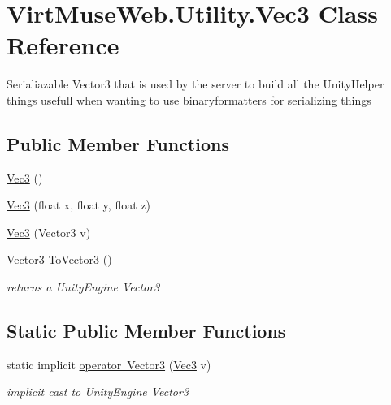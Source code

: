 \hypertarget{class_virt_muse_web_1_1_utility_1_1_vec3}{}\section{Virt\+Muse\+Web.\+Utility.\+Vec3 Class Reference}
\label{class_virt_muse_web_1_1_utility_1_1_vec3}


Serialiazable Vector3 that is used by the server to build all the Unity\+Helper things usefull when wanting to use binaryformatters for serializing things  


\subsection*{Public Member Functions}
\begin{DoxyCompactItemize}
\item 
\mbox{\hyperlink{class_virt_muse_web_1_1_utility_1_1_vec3_a34b343ad30e74ac4e1d92f79a420b0a0}{Vec3}} ()
\item 
\mbox{\hyperlink{class_virt_muse_web_1_1_utility_1_1_vec3_a3cd8f9a64e039ce9ccc8635a3e596cb8}{Vec3}} (float x, float y, float z)
\item 
\mbox{\hyperlink{class_virt_muse_web_1_1_utility_1_1_vec3_a370e123870e29bb0364e0bcdeb76a2ec}{Vec3}} (Vector3 v)
\item 
Vector3 \mbox{\hyperlink{class_virt_muse_web_1_1_utility_1_1_vec3_a0328deac658dc5e70dcf34da465d21fc}{To\+Vector3}} ()
\begin{DoxyCompactList}\small\item\em returns a Unity\+Engine Vector3 \end{DoxyCompactList}\end{DoxyCompactItemize}
\subsection*{Static Public Member Functions}
\begin{DoxyCompactItemize}
\item 
static implicit \mbox{\hyperlink{class_virt_muse_web_1_1_utility_1_1_vec3_af34a58052ccc174dce6803eeabaa9647}{operator Vector3}} (\mbox{\hyperlink{class_virt_muse_web_1_1_utility_1_1_vec3}{Vec3}} v)
\begin{DoxyCompactList}\small\item\em implicit cast to Unity\+Engine Vector3 \end{DoxyCompactList}\end{DoxyCompactItemize}
